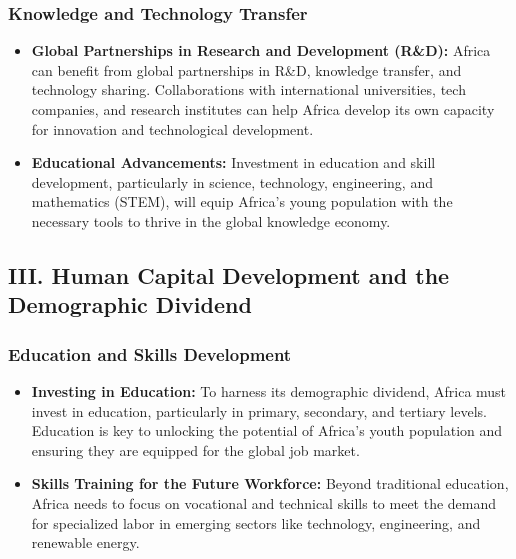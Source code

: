 \documentclass[10pt]{article}
\begin{document}
\subsubsection*{Knowledge and Technology Transfer}
\begin{itemize}
  \item \textbf{Global Partnerships in Research and Development (R\&D):} Africa can benefit
    from global partnerships in R\&D, knowledge transfer, and technology sharing.
    Collaborations with international universities, tech companies, and research
    institutes can help Africa develop its own capacity for innovation and
    technological development.

  \item \textbf{Educational Advancements:} Investment in education and skill development,
    particularly in science, technology, engineering, and mathematics (STEM), will
    equip Africa's young population with the necessary tools to thrive in the global
    knowledge economy.
\end{itemize}

\subsection*{III. Human Capital Development and the Demographic Dividend}

\subsubsection*{Education and Skills Development}
\begin{itemize}
  \item \textbf{Investing in Education:} To harness its demographic dividend, Africa must invest
    in education, particularly in primary, secondary, and tertiary levels. Education is
    key to unlocking the potential of Africa's youth population and ensuring they are
    equipped for the global job market.

  \item \textbf{Skills Training for the Future Workforce:} Beyond traditional education, Africa
    needs to focus on vocational and technical skills to meet the demand for
    specialized labor in emerging sectors like technology, engineering, and renewable
    energy.
\end{itemize}
\end{document}
